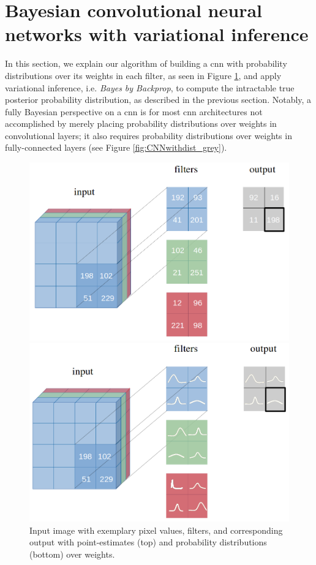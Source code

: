 \section{Bayesian convolutional neural networks with variational inference}
In this section, we explain our algorithm of building a \ac{cnn} with probability distributions over its weights in each filter, as seen in Figure \ref{fig:filter_scalar}, and apply variational inference, i.e. \textit{Bayes by Backprop}, to compute the intractable true posterior probability distribution, as described in the previous section. Notably, a fully Bayesian perspective on a \ac{cnn} is for most \ac{cnn} architectures not accomplished by merely placing probability distributions over weights in convolutional layers; it also requires probability distributions over weights in fully-connected layers (see Figure \ref{fig:CNNwithdist_grey}). 
%
\begin{figure}[H] 
\centering
\begin{minipage}{.4\textwidth}
\centering
\includegraphics[width=\linewidth]{Chapter4/Figs/filter_scalars.png}
\end{minipage}
%
\begin{minipage}{.4\textwidth}
\centering
\includegraphics[width=\linewidth]{Chapter4/Figs/CNNwithdist.png}
\end{minipage}
\caption{Input image with exemplary pixel values, filters, and corresponding output with point-estimates (top) and probability distributions (bottom) over weights.}
\label{fig:filter_scalar}
\end{figure} 
